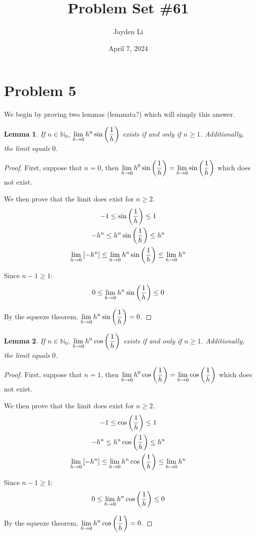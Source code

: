 \documentclass{article}
\title{Problem Set \#61}
\author{Jayden Li}
\date{April 7, 2024}
\newtheorem{lemma}{Lemma}
\newcommand*{\paren}[1]{\ensuremath\left(#1\right)}
\newcommand*{\problem}[1]{\section*{Problem #1}}
\newcommand*{\limit}[2][x]{\ensuremath{\displaystyle\lim_{#1\to#2}}}
\newcommand*{\Limit}[3][x]{\ensuremath{\displaystyle\lim_{#1\to#2}\left[#3\right]}}
\begin{document}
\fontsize{12pt}{12pt}\selectfont
\setlength{\abovedisplayskip}{0pt}
\maketitle

\problem{5}
We begin by proving two lemmas (lemmata?) which will simply this answer.

\begin{lemma}
	If $n\in\mathbb{N}_0$, $\limit[h]{0}h^{n}\sin\paren{\frac{1}{h}}$ exists if and only if $n\geq1$. Additionally, the limit equals $0$.
\end{lemma}
\begin{proof}
	First, suppose that $n=0$, then $\limit[h]{0}h^0\sin\paren{\frac{1}{h}}=\limit[h]{0}\sin\paren{\frac{1}{h}}$ which does not exist.

	We then prove that the limit does exist for $n\geq2$.
	\begin{gather*}
		-1\leq\sin\paren{\frac{1}{h}}\leq1 \\
		-h^{n}\leq h^{n}\sin\paren{\frac{1}{h}}\leq h^{n} \\
		\Limit[h]{0}{-h^{n}}\leq\limit[h]{0}h^{n}\sin\paren{\frac{1}{h}}\leq\limit[h]{0}h^{n}
	\end{gather*}

	Since $n-1\geq1$:
	\begin{equation*}
		0\leq\limit[h]{0}h^{n}\sin\paren{\frac{1}{h}}\leq0
	\end{equation*}

	By the squeeze theorem, $\limit[h]{0}h^{n}\sin\paren{\frac{1}{h}}=0$.
\end{proof}

\begin{lemma}
	If $n\in\mathbb{N}_0$, $\limit[h]{0}h^{n}\cos\paren{\frac{1}{h}}$ exists if and only if $n\geq1$. Additionally, the limit equals $0$.
\end{lemma}
\begin{proof}
	First, suppose that $n=1$, then $\limit[h]{0}h^0\cos\paren{\frac{1}{h}}=\limit[h]{0}\cos\paren{\frac{1}{h}}$ which does not exist.

	We then prove that the limit does exist for $n\geq2$.
	\begin{gather*}
		-1\leq\cos\paren{\frac{1}{h}}\leq1 \\
		-h^{n}\leq h^{n}\cos\paren{\frac{1}{h}}\leq h^{n} \\
		\Limit[h]{0}{-h^{n}}\leq\limit[h]{0}h^{n}\cos\paren{\frac{1}{h}}\leq\limit[h]{0}h^{n}
	\end{gather*}

	Since $n-1\geq1$:
	\begin{equation*}
		0\leq\limit[h]{0}h^{n}\cos\paren{\frac{1}{h}}\leq0
	\end{equation*}

	By the squeeze theorem, $\limit[h]{0}h^{n}\cos\paren{\frac{1}{h}}=0$.
\end{proof}
\end{document}
